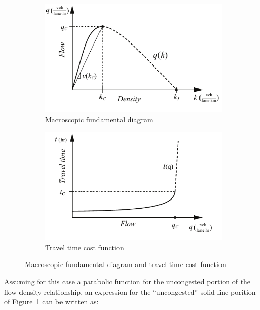 \documentclass{article}
\begin{document}
\begin{figure}[!ht]
     \centering
     \hfill
     \begin{subfigure}[b]{0.45\textwidth}
         \centering
         \includegraphics[width=\textwidth]{diagram_mfd}
         \caption{Macroscopic fundamental diagram}
         \label{fig:mfd}
     \end{subfigure}
     \hfill
     \begin{subfigure}[b]{0.45\textwidth}
         \centering
         \includegraphics[width=\textwidth]{diagram_traveltime}
        \caption{Travel time cost function}
         \label{fig:traveltime}
     \end{subfigure}
     \hfill
     \caption{Macroscopic fundamental diagram and travel time cost function}
\end{figure}

Assuming for this case a parabolic function for the uncongested portion of the flow-density relationship, an expression for the ``uncongested'' solid line porition of Figure~\ref{fig:mfd} can be written as:
\end{document}
